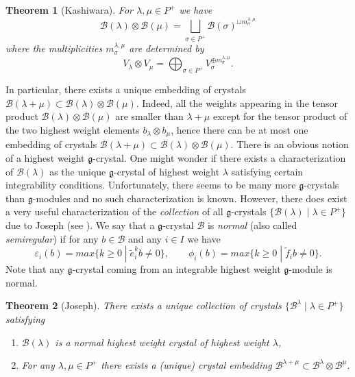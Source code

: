 \documentclass[a4paper,10pt]{amsart}
\def\g{\mathfrak{g}}
\newtheorem{theo}{\bf{Theorem}}[section]
\numberwithin{equation}{section}
\begin{document}
\vspace{.1in}

\begin{theo}[Kashiwara] For $\lambda,\mu \in P^+$ we have
$$\mathcal{B}(\lambda) \otimes \mathcal{B}(\mu)=\bigsqcup_{\sigma \in P^+} \mathcal{B}(\sigma)^{\sqcup m^{\lambda,\mu}_{\sigma}}$$
where the multiplicities $m^{\lambda,\mu}_{\sigma}$ are determined by
$$V_\lambda \otimes V_\mu=\bigoplus_{\sigma \in P^+} V_{\sigma}^{\oplus m^{\lambda,\mu}_{\sigma}}.$$
\end{theo}

\vspace{.1in}

In particular, there exists a unique embedding of crystals $\mathcal{B}(\lambda +\mu) \subset \mathcal{B}(\lambda) \otimes \mathcal{B}(\mu)$. Indeed, all the weights appearing in the tensor product $\mathcal{B}(\lambda) \otimes \mathcal{B}(\mu)$ are smaller than $\lambda + \mu$ except for the tensor product of the two highest weight elements $b_{\lambda} \otimes b_{\mu}$, hence there can be at most one embedding of crystals $\mathcal{B}(\lambda +\mu) \subset \mathcal{B}(\lambda) \otimes \mathcal{B}(\mu)$.
There is an obvious notion of a highest weight $\g$-crystal. One might wonder if there exists a characterization of $\mathcal{B}(\lambda)$ as the unique $\g$-crystal of highest weight $\lambda$ satisfying certain integrability conditions. Unfortunately, there seems to be many more $\g$-crystals than $\g$-modules and no such characterization is known. However, there does exist a very useful characterization of the \textit{collection} of all $\g$-crystals $\{\mathcal{B}(\lambda)\;|\; \lambda \in P^+\}$ due to Joseph (see \cite[Prop.~6.4.21]{Joseph}). We say that a $\g$-crystal $\mathcal{B}$ is \textit{normal} (also called \textit{semiregular}) if for any $b \in \mathcal{B}$ and any $i \in I$ we have
$$\varepsilon_i(b)=max\{k \geq 0\;|\; \tilde{e}_i^kb \neq 0\}, \qquad \phi_i(b)=max\{k \geq 0\;|\; \tilde{f}_ib \neq 0\}.$$
Note that any $\g$-crystal coming from an integrable highest weight $\g$-module is normal.

\vspace{.1in}

\begin{theo}[Joseph] There exists a unique collection of crystals $\{\mathcal{B}^{\lambda}\;|\; \lambda \in P^+\}$ satisfying
\begin{enumerate}
\item[i)] $\mathcal{B}(\lambda)$ is a normal highest weight crystal of highest weight $\lambda$,
\item[ii)] For any $\lambda,\mu \in P^+$ there exists a (unique) crystal embedding $\mathcal{B}^{\lambda+\mu} \subset \mathcal{B}^{\lambda} \otimes \mathcal{B}^{\mu}$.
\end{enumerate}
\end{theo}
\end{document}
